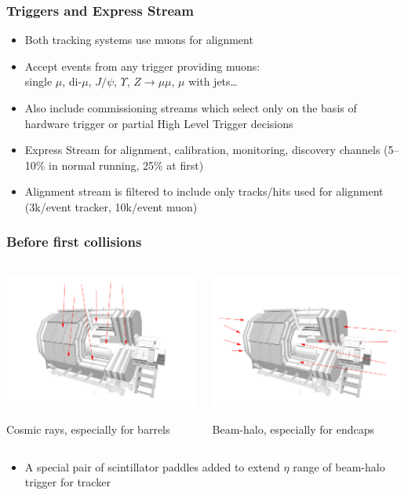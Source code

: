 \documentclass[compress]{beamer}
\begin{document}
\begin{frame}
\frametitle{Triggers and Express Stream}
\begin{itemize}\setlength{\itemsep}{0.25 cm}
\item<1-> Both tracking systems use muons for alignment
\item<1-> Accept events from any trigger providing muons: \\ single $\mu$, di-$\mu$, $J/\psi$, $\Upsilon$, $Z \to \mu\mu$, $\mu$ with jets\ldots
\item<1-> Also include commissioning streams which select only on the basis of hardware trigger or partial High Level Trigger decisions

\vfill
\item<2-> Express Stream for alignment, calibration, monitoring, discovery channels (5--10\% in normal running, 25\% at first)
\item<2-> Alignment stream is filtered to include only tracks/hits used for alignment (3k/event tracker, 10k/event muon)
\end{itemize}
\end{frame}

\begin{frame}
\frametitle{Before first collisions}
\vspace{-1 cm}
\begin{columns}
\begin{center}
\includegraphics[height=3.5 cm]{cosmics.pdf}

Cosmic rays, especially for barrels
\end{center}

\begin{center}
\includegraphics[height=3.5 cm]{beamhalo.pdf}

Beam-halo, especially for endcaps
\end{center}
\end{columns}

\vfill
\begin{itemize}
\item A special pair of scintillator paddles added to extend
$\eta$ range of beam-halo trigger for tracker
\end{itemize}
\end{frame}
\end{document}
